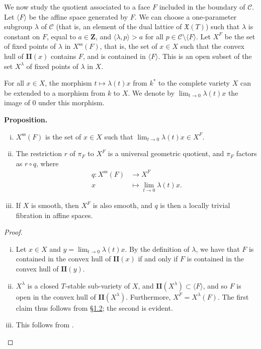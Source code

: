 \documentclass{article}
\newenvironment{itenv}[1]
  {\phantomsection\par\medskip\noindent\textbf{#1.}\itshape}
  {\par\medskip}
\newcommand{\ZZ}{\mathbf{Z}}
\renewcommand{\ss}{\mathrm{ss}}
\newcommand{\II}{\mathbf{II}}
\newcommand{\oldpage}[1]{\marginpar{\footnotesize$\Big\vert$ \textit{p.~#1}}}
\begin{document}
We now study the quotient associated to a face $F$ included in the boundary of $\mathcal{C}$.
Let $\langle F\rangle$ be the affine space generated by $F$.
We can choose a one-parameter subgroup $\lambda$ of $\mathcal{C}$ (that is, an element of the dual lattice of $\mathfrak{X}(T)$) such that $\lambda$ is constant on $F$, equal to $a\in\ZZ$, and $\langle\lambda,p\rangle>a$ for all $p\in\mathcal{C}\setminus\langle F\rangle$.
Let $X^F$ be the set of fixed points of $\lambda$ in $X^\ss(F)$, that is, the set of $x\in X$ such that the convex hull of $\II(x)$ contains $F$, and is contained in $\langle F\rangle$.
This is an open subset of the set $X^\lambda$ of fixed points of $\lambda$ in $X$.

For all $x\in X$, the morphism $t\mapsto\lambda(t)x$ from $k^*$ to the complete variety $X$ can be extended to a morphism from $k$ to $X$.
We denote by $\lim_{t\to0}\lambda(t)x$ the image of $0$ under this morphism.

\begin{itenv}{Proposition}
  \begin{enumerate}[(i)]
    \item $X^\ss(F)$ is the set of $x\in X$ such that $\lim_{t\to0}\lambda(t)x\in X^F$.
    \item The restriction $r$ of $\pi_F$ to $X^F$ is a universal geometric quotient, and $\pi_F$ factors as $r\circ q$, where
      \[
        \begin{aligned}
          q\colon X^\ss(F) &\to X^F
        \\x &\mapsto \lim_{t\to0}\lambda(t)x.
        \end{aligned}
      \]
    \item If $X$ is smooth, then $X^F$ is also smooth, and $q$ is then a locally trivial fibration in affine spaces.
  \end{enumerate}
\end{itenv}

\begin{proof}
  \begin{enumerate}[(i)]
    \item Let $x\in X$ and $y=\lim_{t\to0}\lambda(t)x$.
      By the definition of $\lambda$, we have that
\oldpage{516}
      $F$ is contained in the convex hull of $\II(x)$ if and only if $F$ is contained in the convex hull of $\II(y)$.
    \item $X^\lambda$ is a closed $T$-stable sub-variety of $X$, and $\II(X^\lambda)\subset\langle F\rangle$, and so $F$ is open in the convex hull of $\II(X^\lambda)$.
      Furthermore, $X^F=X^\lambda(F)$.
      The first claim thus follows from \hyperref[1.2]{\S1.2};
      the second is evident.
    \item This follows from \cite[Theorem~4.4.]{BB}.
  \end{enumerate}
\end{proof}
\end{document}
